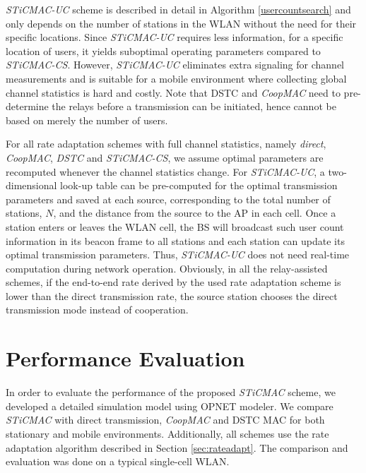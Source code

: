 \documentclass[peerreview,draftcls,onecolumn,12pt,a4paper]{IEEEtran}
\begin{document}
\begin{itemize}
\emph{STiCMAC-UC} scheme is described in detail in Algorithm
\ref{usercountsearch} and only depends on the number of stations
in the WLAN without the need for their specific locations. Since
\emph{STiCMAC-UC} requires less information, for a specific
location of users, it yields suboptimal operating parameters
compared to \emph{STiCMAC-CS}. However, \emph{STiCMAC-UC}
eliminates extra signaling for channel measurements and is
suitable for a mobile environment where collecting global channel
statistics is hard and costly. Note that DSTC and {\em CoopMAC}
need to pre-determine the relays before a transmission can be
initiated, hence cannot be based on merely the number of users.
\end{itemize}


For all rate adaptation schemes with full channel statistics, namely \emph{direct}, \emph{CoopMAC}, \emph{DSTC} and \emph{STiCMAC-CS}, we assume optimal parameters are recomputed whenever the channel statistics change. For \emph{STiCMAC-UC}, a two-dimensional look-up table can be
pre-computed for the optimal transmission parameters and saved at
each source, corresponding to the total number of stations, $N$,
and the distance from the source to the AP in each cell. Once a
station enters or leaves the WLAN cell, the BS will broadcast such
user count information in its beacon frame to all stations and
each station can update its optimal transmission parameters. Thus,
\emph{STiCMAC-UC} does not need real-time computation during
network operation. Obviously, in all the relay-assisted schemes,
if the end-to-end rate derived by the used rate adaptation scheme
is lower than the direct transmission rate, the source station
chooses the direct transmission mode instead of cooperation.





\vspace{-0.2in}
\section{Performance Evaluation}
\label{PerformanceEvaluation} 

In order to evaluate the performance of the proposed {\em STiCMAC} scheme, we developed a detailed simulation model using OPNET modeler. We compare {\em STiCMAC} with direct transmission, {\em CoopMAC} and DSTC MAC for both stationary and mobile environments. Additionally, all schemes use the rate adaptation algorithm described in Section \ref{sec:rateadapt}. The comparison and evaluation was done on a typical single-cell WLAN.
\end{document}
